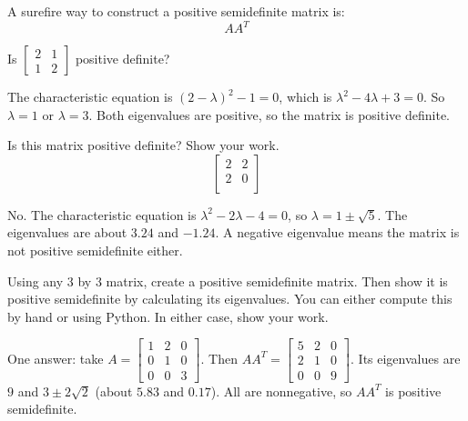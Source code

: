 A surefire way to construct a positive semidefinite matrix is:
$$AA^{T}$$

\begin{Worked}
\begin{Problem}
Is $\begin{bmatrix} 2 & 1 \\ 1 & 2 \end{bmatrix}$ positive definite?
\end{Problem}
\begin{Solution}
The characteristic equation is $(2 - \lambda)^2 - 1 = 0$, which is $\lambda^2 - 4\lambda + 3 = 0$. So $\lambda = 1$ or $\lambda = 3$. Both eigenvalues are positive, so the matrix is positive definite.
\end{Solution}
\end{Worked}

\begin{Exercise}[title={Figuring out if a matrix is positive semidefinite}, label=pos-matrix-01]
Is this matrix positive definite? Show your work.
$$
\begin{bmatrix}
 2  & 2 \\
 2  & 0 \\
\end{bmatrix}
$$
\end{Exercise}

\begin{Answer}[ref=pos-matrix-01]
No. The characteristic equation is $\lambda^2 - 2\lambda - 4 = 0$, so $\lambda = 1 \pm \sqrt{5}$. The eigenvalues are about $3.24$ and $-1.24$. A negative eigenvalue means the matrix is not positive semidefinite either.
\end{Answer}
  
\begin{Exercise}[title={Creating a positive semidefinite matrix}, label=pos-matrix-02]
Using any 3 by 3 matrix, create a positive semidefinite matrix. Then show it is positive semidefinite by calculating its eigenvalues.  You can either compute this by hand or using Python.  In either case, show your work.
\end{Exercise}

\begin{Answer}[ref=pos-matrix-02]
One answer: take $A = \begin{bmatrix} 1 & 2 & 0 \\ 0 & 1 & 0 \\ 0 & 0 & 3 \end{bmatrix}$. Then $AA^T = \begin{bmatrix} 5 & 2 & 0 \\ 2 & 1 & 0 \\ 0 & 0 & 9 \end{bmatrix}$. Its eigenvalues are $9$ and $3 \pm 2\sqrt{2}$ (about $5.83$ and $0.17$). All are nonnegative, so $AA^T$ is positive semidefinite.
\end{Answer}

